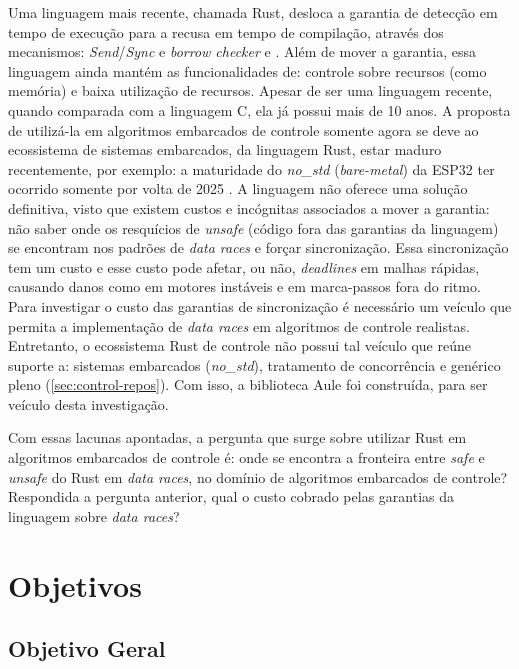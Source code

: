 Uma linguagem mais recente, chamada Rust, desloca a garantia de detecção em tempo de execução para a recusa em tempo de compilação, através dos mecanismos: \textit{Send}/\textit{Sync} e \textit{borrow checker} \citep{article:rust-safe-soundness} e \citep{article:rust-critical}. Além de mover a garantia, essa linguagem ainda mantém as funcionalidades de: controle sobre recursos (como memória) e baixa utilização de recursos. Apesar de ser uma linguagem recente, quando comparada com a linguagem C, ela já possui mais de 10 anos. A proposta de utilizá-la em algoritmos embarcados de controle somente agora se deve ao ecossistema de sistemas embarcados, da linguagem Rust, estar maduro recentemente, por exemplo: a maturidade do \textit{no\_std} (\textit{bare-metal}) da ESP32 ter ocorrido somente por volta de 2025 \citep{url:esp-rust-no-std-stable}. A linguagem não oferece uma solução definitiva, visto que existem custos e incógnitas associados a mover a garantia: não saber onde os resquícios de \textit{unsafe} (código fora das garantias da linguagem) se encontram nos padrões de \textit{data races} e forçar sincronização. Essa sincronização tem um custo e esse custo pode afetar, ou não, \textit{deadlines} em malhas rápidas, causando danos como em motores instáveis e em marca-passos fora do ritmo. Para investigar o custo das garantias de sincronização é necessário um veículo que permita a implementação de \textit{data races} em algoritmos de controle realistas. Entretanto, o ecossistema Rust de controle não possui tal veículo que reúne suporte a: sistemas embarcados (\textit{no\_std}), tratamento de concorrência e genérico pleno (\ref{sec:control-repos}). Com isso, a biblioteca Aule \citep{aule} foi construída, para ser veículo desta investigação.

Com essas lacunas apontadas, a pergunta que surge sobre utilizar Rust em algoritmos embarcados de controle é: onde se encontra a fronteira entre \textit{safe} e \textit{unsafe} do Rust em \textit{data races}, no domínio de algoritmos embarcados de controle? Respondida a pergunta anterior, qual o custo cobrado pelas garantias da linguagem sobre \textit{data races}?

\section{Objetivos}

\subsection{Objetivo Geral}

